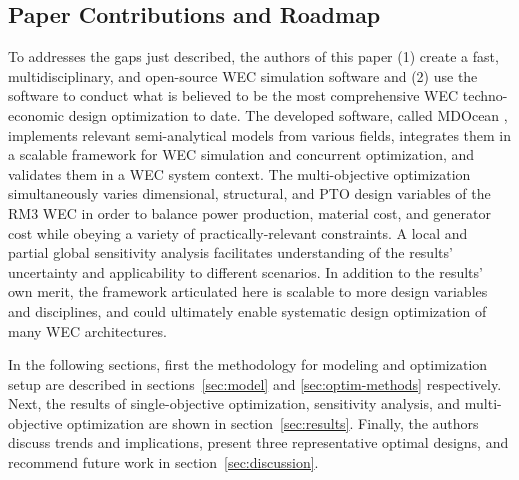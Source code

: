 \subsection{Paper Contributions and Roadmap}
To addresses the gaps just described, the authors of this paper (1) create a fast, multidisciplinary, and open-source WEC simulation software and (2) use the software to conduct what is believed to be the most comprehensive WEC techno-economic design optimization to date.
The developed software, called MDOcean \cite{mccabe_mdocean_2024}, implements relevant semi-analytical models from various fields, integrates them in a scalable framework for WEC simulation and concurrent optimization, and validates them in a WEC system context.
The multi-objective optimization simultaneously varies dimensional, structural, and PTO design variables of the RM3 WEC in order to balance power production, material cost, and generator cost while obeying a variety of practically-relevant constraints.
A local and partial global sensitivity analysis facilitates understanding of the results' uncertainty and applicability to different scenarios.
In addition to the results' own merit, the framework articulated here is scalable to more design variables and disciplines, and could ultimately enable systematic design optimization of many WEC architectures.

In the following sections, first the methodology for modeling and optimization setup are described in sections~\ref{sec:model} and \ref{sec:optim-methods} respectively.
Next, the results of single-objective optimization, sensitivity analysis, and multi-objective optimization are shown in section~\ref{sec:results}.
Finally, the authors discuss trends and implications, present three representative optimal designs, and recommend future work in section~\ref{sec:discussion}.
